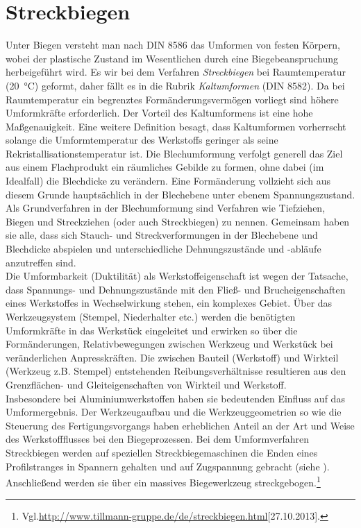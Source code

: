 \documentclass[12pt,a4paper,parskip,twoside,BCOR5mm,headsepline]{scrartcl}
\begin{document}
	 	 	 	 
	 	 	 	 

\section{Streckbiegen}
Unter Biegen versteht man nach DIN 8586 das Umformen von festen Körpern, wobei der plastische Zustand im Wesentlichen durch eine Biegebeanspruchung herbeigeführt wird.\autocite[376]{hu} Es wir bei dem Verfahren \emph{Streckbiegen} bei Raumtemperatur (\SI{20}{\degreeCelsius})  geformt, daher fällt es in die Rubrik \emph{Kaltumformen} (DIN 8582). Da bei Raumtemperatur ein begrenztes Formänderungsvermögen vorliegt sind höhere Umformkräfte erforderlich. Der Vorteil des Kaltumformens ist eine hohe Maßgenauigkeit.\autocite[8]{hu}  Eine weitere Definition besagt, dass Kaltumformen vorherrscht solange die Umformtemperatur des Werkstoffs geringer als seine Rekristallisationstemperatur ist.\autocite[187]{fu} Die Blechumformung verfolgt generell das Ziel aus einem Flachprodukt ein räumliches Gebilde zu formen, ohne dabei (im Idealfall) die Blechdicke zu verändern.  Eine Formänderung vollzieht sich aus diesem Grunde hauptsächlich in der Blechebene unter ebenem Spannungszustand. Als Grundverfahren in der Blechumformung sind Verfahren wie Tiefziehen, Biegen und Streckziehen (oder auch Streckbiegen) zu nennen. Gemeinsam haben sie alle, dass sich Stauch- und Streckverformungen in der Blechebene und Blechdicke abspielen und unterschiedliche Dehnungszustände und -abläufe anzutreffen sind.\\ Die Umformbarkeit (Duktilität) als Werkstoffeigenschaft ist wegen der Tatsache, dass  Spannungs- und Dehnungszustände mit den Fließ- und Brucheigenschaften eines Werkstoffes in Wechselwirkung stehen, ein komplexes Gebiet. Über das Werkzeugsystem (Stempel, Niederhalter etc.) werden die benötigten Umformkräfte in das Werkstück eingeleitet und erwirken so über die  Formänderungen, Relativbewegungen zwischen Werkzeug und Werkstück bei veränderlichen Anpresskräften. Die zwischen Bauteil (Werkstoff) und Wirkteil (Werkzeug z.B. Stempel) entstehenden Reibungsverhältnisse resultieren aus den  Grenzflächen- und Gleiteigenschaften von Wirkteil und Werkstoff.\\ Insbesondere bei Aluminiumwerkstoffen haben sie bedeutenden Einfluss auf das Umformergebnis. Der Werkzeugaufbau und die Werkzeuggeometrien so wie die Steuerung des Fertigungsvorgangs haben erheblichen Anteil an der Art und Weise des Werkstoffflusses bei den Biegeprozessen. \autocite[499]{aa}
Bei dem Umformverfahren Streckbiegen werden auf speziellen Streckbiegemaschinen die Enden eines Profilstranges in Spannern gehalten und auf  Zugspannung gebracht (siehe  ). Anschließend werden sie über ein massives Biegewerkzeug streckgebogen.\footnote{Vgl.\url{http://www.tillmann-gruppe.de/de/streckbiegen.html}[27.10.2013].} 
\end{document}
